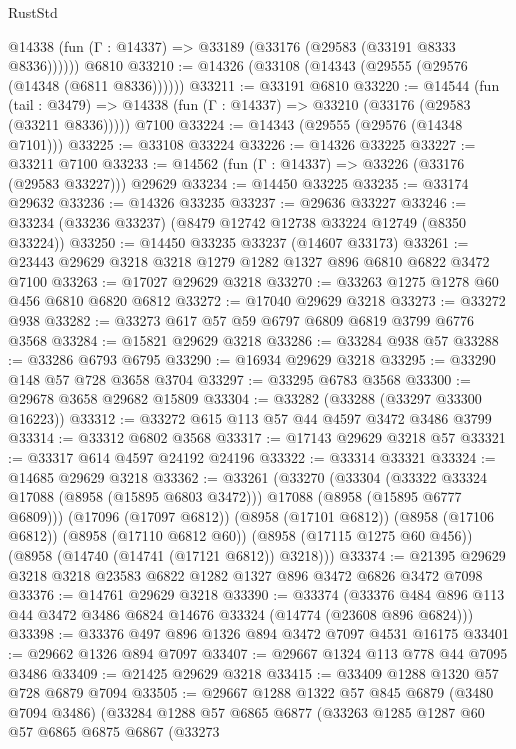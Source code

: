 \begin{lexlean}{RustStd}
\begin{coremodule}
      @14338 (fun (Γ : @14337) => @33189 (@33176 (@29583 (@33191 @8333 @8336))))))
    @6810
@33210 := @14326 (@33108 (@14343 (@29555 (@29576 (@14348 (@6811 @8336))))))
@33211 := @33191 @6810
@33220 := @14544
    (fun (tail : @3479) => @14338 (fun (Γ : @14337) => @33210 (@33176 (@29583 (@33211 @8336)))))
    @7100
@33224 := @14343 (@29555 (@29576 (@14348 @7101)))
@33225 := @33108 @33224
@33226 := @14326 @33225
@33227 := @33211 @7100
@33233 := @14562 (fun (Γ : @14337) => @33226 (@33176 (@29583 @33227))) @29629
@33234 := @14450 @33225
@33235 := @33174 @29632
@33236 := @14326 @33235
@33237 := @29636 @33227
@33246 := @33234 (@33236 @33237) (@8479 @12742 @12738 @33224 @12749 (@8350 @33224))
@33250 := @14450 @33235 @33237 (@14607 @33173)
@33261 := @23443 @29629 @3218 @3218 @1279 @1282 @1327 @896 @6810 @6822 @3472 @7100
@33263 := @17027 @29629 @3218
@33270 := @33263 @1275 @1278 @60 @456 @6810 @6820 @6812
@33272 := @17040 @29629 @3218
@33273 := @33272 @938
@33282 := @33273 @617 @57 @59 @6797 @6809 @6819 @3799 @6776 @3568
@33284 := @15821 @29629 @3218
@33286 := @33284 @938 @57
@33288 := @33286 @6793 @6795
@33290 := @16934 @29629 @3218
@33295 := @33290 @148 @57 @728 @3658 @3704
@33297 := @33295 @6783 @3568
@33300 := @29678 @3658 @29682 @15809
@33304 := @33282 (@33288 (@33297 @33300 @16223))
@33312 := @33272 @615 @113 @57 @44 @4597 @3472 @3486 @3799
@33314 := @33312 @6802 @3568
@33317 := @17143 @29629 @3218 @57
@33321 := @33317 @614 @4597 @24192 @24196
@33322 := @33314 @33321
@33324 := @14685 @29629 @3218
@33362 := @33261
    (@33270
      (@33304
        (@33322 @33324 @17088 (@8958 (@15895 @6803 @3472)))
        @17088
        (@8958 (@15895 @6777 @6809)))
      (@17096 (@17097 @6812))
      (@8958 (@17101 @6812))
      (@8958 (@17106 @6812))
      (@8958 (@17110 @6812 @60))
      (@8958 (@17115 @1275 @60 @456))
      (@8958 (@14740 (@14741 (@17121 @6812)) @3218)))
@33374 := @21395 @29629 @3218 @3218 @23583 @6822 @1282 @1327 @896 @3472 @6826 @3472 @7098
@33376 := @14761 @29629 @3218
@33390 := @33374
    (@33376 @484 @896 @113 @44 @3472 @3486 @6824 @14676 @33324 (@14774 (@23608 @896 @6824)))
@33398 := @33376 @497 @896 @1326 @894 @3472 @7097 @4531 @16175
@33401 := @29662 @1326 @894 @7097
@33407 := @29667 @1324 @113 @778 @44 @7095 @3486
@33409 := @21425 @29629 @3218
@33415 := @33409 @1288 @1320 @57 @728 @6879 @7094
@33505 := @29667
    @1288
    @1322
    @57
    @845
    @6879
    (@3480 @7094 @3486)
    (@33284
      @1288
      @57
      @6865
      @6877
      (@33263
        @1285
        @1287
        @60
        @57
        @6865
        @6875
        @6867
        (@33273

\end{coremodule}
\end{lexlean}
